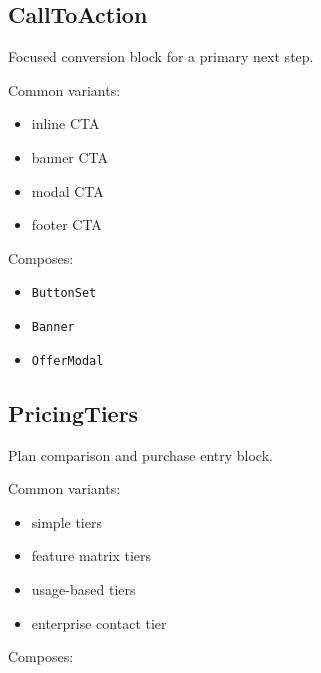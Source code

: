 \subsection{CallToAction}\label{record-128-calltoaction}

Focused conversion block for a primary next step.

Common variants:

\begin{itemize}
\tightlist
\item
  inline CTA
\item
  banner CTA
\item
  modal CTA
\item
  footer CTA
\end{itemize}

Composes:

\begin{itemize}
\tightlist
\item
  \texttt{B\allowbreak{}u\allowbreak{}t\allowbreak{}t\allowbreak{}o\allowbreak{}n\allowbreak{}S\allowbreak{}e\allowbreak{}t}
\item
  \texttt{B\allowbreak{}a\allowbreak{}n\allowbreak{}n\allowbreak{}e\allowbreak{}r}
\item
  \texttt{O\allowbreak{}f\allowbreak{}f\allowbreak{}e\allowbreak{}r\allowbreak{}M\allowbreak{}o\allowbreak{}d\allowbreak{}a\allowbreak{}l}
\end{itemize}

\subsection{PricingTiers}\label{record-128-pricingtiers}

Plan comparison and purchase entry block.

Common variants:

\begin{itemize}
\tightlist
\item
  simple tiers
\item
  feature matrix tiers
\item
  usage-based tiers
\item
  enterprise contact tier
\end{itemize}

Composes:

